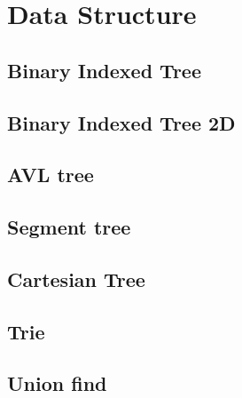 \newpage
\section{Data Structure}

\subsection{Binary Indexed Tree}


\subsection{Binary Indexed Tree 2D}


\subsection{AVL tree}
%

\subsection{Segment tree}


\subsection{Cartesian Tree}


\subsection{Trie}


\subsection{Union find}
